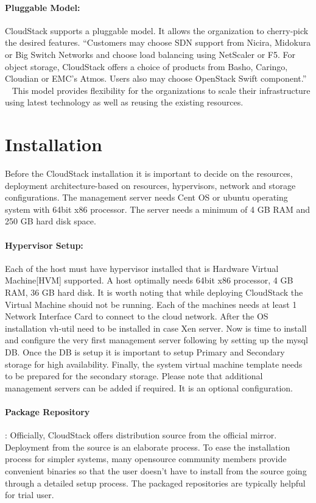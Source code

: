 \paragraph {Pluggable Model:} CloudStack supports a pluggable model. It 
allows the organization to cherry-pick the desired features. ``Customers may 
choose SDN support from Nicira, Midokura or Big Switch Networks and choose load
balancing using NetScaler or F5. For object storage, CloudStack offers a choice of
products from Basho, Caringo, Cloudian or EMC's Atmos. Users also may choose
OpenStack Swift component.'' ~\cite{hid-sp18-417-www-cloudstack-model}
This model provides flexibility for the organizations to scale their infrastructure 
using latest technology as well as reusing the existing resources.

\section{Installation}

Before the CloudStack installation it is important to decide on the resources,
deployment architecture-based on resources, hypervisors, network and storage 
configurations. The management server needs Cent OS or ubuntu operating system
with 64bit x86 processor. The server needs a minimum of 4 GB RAM and 250 GB
hard disk space. 

\paragraph {Hypervisor Setup:} Each of the host must have hypervisor installed that is Hardware
Virtual Machine[HVM] supported. A host optimally needs 64bit x86 processor, 4 GB
RAM, 36 GB hard disk. It is worth noting that while deploying CloudStack the Virtual 
Machine shouid not be running. Each of the machines needs at least 1 Network Interface Card 
to connect to the cloud network.  After the OS installation vh-util need to be installed 
in case Xen server. Now is time to install and configure the very first management 
server following by setting up the mysql DB. Once the DB is setup it is important to 
setup Primary and Secondary storage for high availability. Finally, the system virtual 
machine template needs to be prepared for the secondary storage. Please note
 that additional management servers can be added if required. It is an optional configuration.

\paragraph {Package Repository}: Officially, CloudStack offers distribution source from the 
official mirror. Deployment from the source is an elaborate process. To ease the installation 
process for simpler systems, many opensource community members provide convenient binaries
so that the user doesn’t have to install from the source going through a detailed setup 
process. The packaged repositories are typically helpful for trial user. ~\cite{hid-sp18-417-www-cloudstack-installation}


